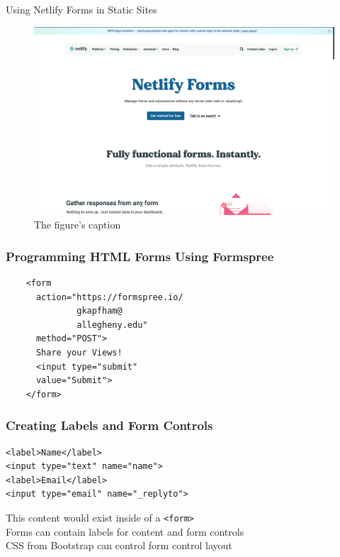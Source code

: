 \documentclass[14pt,aspectratio=169]{beamer}
\begin{document}
%
\begin{frame}{Using Netlify Forms in Static Sites}
  \begin{figure}
    \centering
    \includegraphics[scale=.08]{images/netlifyforms.png}
    \caption{The figure's caption}
  \end{figure}
\end{frame}

%
\begin{frame}[fragile]
  \frametitle{Programming HTML Forms Using Formspree}
  \normalsize
  \begin{minipage}{6in}
    \vspace*{.1in}
    \begin{verbatim}
    <form
      action="https://formspree.io/
              gkapfham@
              allegheny.edu"
      method="POST">
      Share your Views!
      <input type="submit"
      value="Submit">
    </form>
    \end{verbatim}
  \end{minipage}
\end{frame}

%
\begin{frame}[fragile]
  \frametitle{Creating Labels and Form Controls}
  \normalsize
  \begin{minipage}{6in}
    \vspace*{.1in}
    \begin{verbatim}
<label>Name</label>
<input type="text" name="name">
<label>Email</label>
<input type="email" name="_replyto">
    \end{verbatim}
  \end{minipage}
  \vspace*{.05in}
  \begin{center}
    \noindent This content would exist inside of a {\tt <form>} \\
    \noindent Forms can contain labels for content and form controls \\
    \noindent CSS from Bootstrap can control form control layout \\
  \end{center}
\end{frame}
\end{document}
